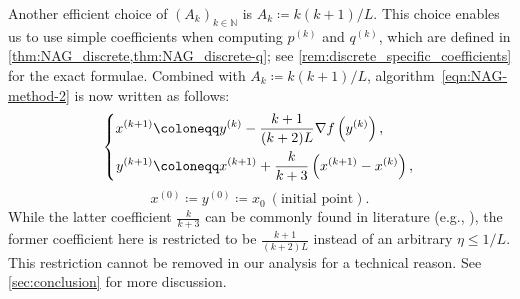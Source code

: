 \documentclass[11pt,a4paper]{article}
\theoremstyle{definition}
\theoremstyle{plain}
\newcommand{\NN}{{\mathbb{N}}}
\begin{document}
Another efficient choice of $(A_k)_{k \in \NN}$ is $A_k \coloneqq k(k + 1)/L$.
This choice enables us to use simple coefficients when computing $p^{(k)}$ and $q^{(k)}$, which are defined in \cref{thm:NAG_discrete,thm:NAG_discrete-q}; see \cref{rem:discrete_specific_coefficients} for the exact formulae.
Combined with $A_k \coloneqq k(k + 1)/L$, algorithm~\eqref{eqn:NAG-method-2} is now written as follows:
\begin{equation}\label{eqn:NAG-method-fixed-parameter}
    \left\{\begin{aligned}
        x^{(k + 1)} &\coloneqq y^{(k)} - \frac{k + 1}{(k + 2)L}\nabla f\left(y^{(k)}\right),\\
        y^{(k + 1)} &\coloneqq x^{(k + 1)} + \frac{k}{k + 3}\left(x^{(k + 1)} - x^{(k)}\right),
    \end{aligned}\right.\\
\end{equation}
\[
    x^{(0)} \coloneqq y^{(0)} \coloneqq x_0\ (\text{initial point}).
\]
While the latter coefficient $\frac{k}{k + 3}$ can be commonly found in literature (e.g., \cite{CSY2022,SDJS2022,SBC2016}), the former coefficient here is restricted to be $\frac{k + 1}{(k + 2)L}$ instead of an arbitrary $\eta \le 1/L$.
This restriction cannot be removed in our analysis for a technical reason.
See \cref{sec:conclusion} for more discussion.
\end{document}
